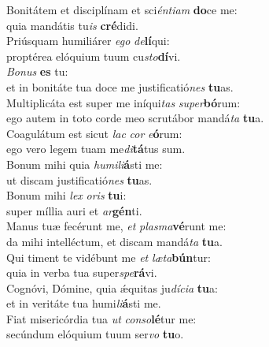\evenverse Bonitátem et disciplínam et sci\textit{én}\textit{ti}\textit{am} \textbf{do}ce me:~\*\\
\evenverse quia mandátis tu\textit{is} \textbf{cré}didi.\\
\oddverse Priúsquam humiliárer \textit{e}\textit{go} \textit{de}\textbf{lí}qui:~\*\\
\oddverse proptérea elóquium tuum cu\textit{sto}\textbf{dí}vi.\\
\evenverse \textit{Bo}\textit{nus} \textbf{es} tu:~\*\\
\evenverse et in bonitáte tua doce me justificatió\textit{nes} \textbf{tu}as.\\
\oddverse Multiplicáta est super me iníqui\textit{tas} \textit{su}\textit{per}\textbf{bó}rum:~\*\\
\oddverse ego autem in toto corde meo scrutábor mandá\textit{ta} \textbf{tu}a.\\
\evenverse Coagulátum est sicut \textit{lac} \textit{cor} \textit{e}\textbf{ó}rum:~\*\\
\evenverse ego vero legem tuam me\textit{di}\textbf{tá}tus sum.\\
\oddverse Bonum mihi quia \textit{hu}\textit{mi}\textit{li}\textbf{á}sti me:~\*\\
\oddverse ut discam justificatió\textit{nes} \textbf{tu}as.\\
\evenverse Bonum mihi \textit{lex} \textit{o}\textit{ris} \textbf{tu}i:~\*\\
\evenverse super míllia auri et \textit{ar}\textbf{gén}ti.\\
\oddverse Manus tuæ fecérunt me, \textit{et} \textit{plas}\textit{ma}\textbf{vé}runt me:~\*\\
\oddverse da mihi intelléctum, et discam mandá\textit{ta} \textbf{tu}a.\\
\evenverse Qui timent te vidébunt me \textit{et} \textit{læ}\textit{ta}\textbf{bún}tur:~\*\\
\evenverse quia in verba tua super\textit{spe}\textbf{rá}vi.\\
\oddverse Cognóvi, Dómine, quia ǽquitas ju\textit{dí}\textit{ci}\textit{a} \textbf{tu}a:~\*\\
\oddverse et in veritáte tua humi\textit{li}\textbf{á}sti me.\\
\evenverse Fiat misericórdia tua \textit{ut} \textit{con}\textit{so}\textbf{lé}tur me:~\*\\
\evenverse secúndum elóquium tuum ser\textit{vo} \textbf{tu}o.\\
